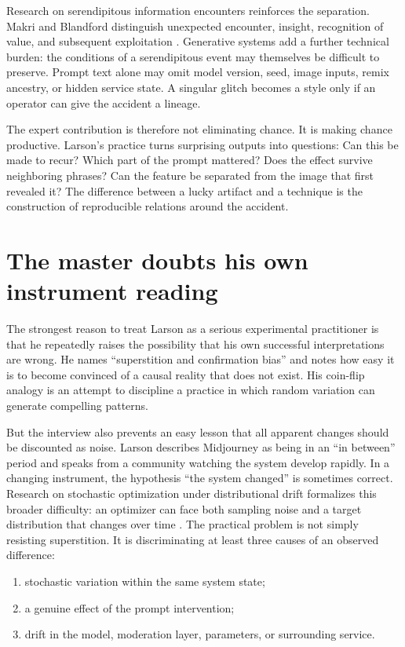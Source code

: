 \documentclass[11pt]{article}
\begin{document}
Research on serendipitous information encounters reinforces the separation. Makri and Blandford distinguish unexpected encounter, insight, recognition of value, and subsequent exploitation \cite{MakriBlandford2012}. Generative systems add a further technical burden: the conditions of a serendipitous event may themselves be difficult to preserve. Prompt text alone may omit model version, seed, image inputs, remix ancestry, or hidden service state. A singular glitch becomes a style only if an operator can give the accident a lineage.

The expert contribution is therefore not eliminating chance. It is making chance productive. Larson's practice turns surprising outputs into questions: Can this be made to recur? Which part of the prompt mattered? Does the effect survive neighboring phrases? Can the feature be separated from the image that first revealed it? The difference between a lucky artifact and a technique is the construction of reproducible relations around the accident.

\section{The master doubts his own instrument reading}
The strongest reason to treat Larson as a serious experimental practitioner is that he repeatedly raises the possibility that his own successful interpretations are wrong. He names ``superstition and confirmation bias'' and notes how easy it is to become convinced of a causal reality that does not exist. His coin-flip analogy is an attempt to discipline a practice in which random variation can generate compelling patterns.

But the interview also prevents an easy lesson that all apparent changes should be discounted as noise. Larson describes Midjourney as being in an ``in between'' period and speaks from a community watching the system develop rapidly. In a changing instrument, the hypothesis ``the system changed'' is sometimes correct. Research on stochastic optimization under distributional drift formalizes this broader difficulty: an optimizer can face both sampling noise and a target distribution that changes over time \cite{CutlerDrusvyatskiyHarchaoui2023}. The practical problem is not simply resisting superstition. It is discriminating at least three causes of an observed difference:

\begin{enumerate}[nosep]
\item stochastic variation within the same system state;
\item a genuine effect of the prompt intervention;
\item drift in the model, moderation layer, parameters, or surrounding service.
\end{enumerate}
\end{document}
